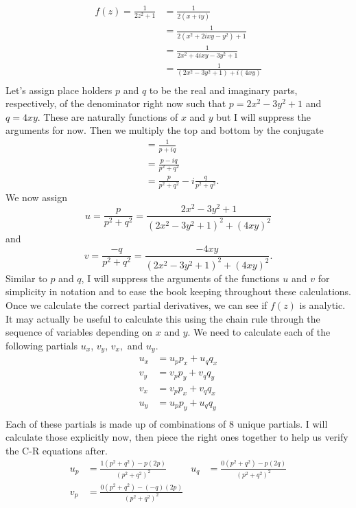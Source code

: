 \documentclass[10pt]{amsart}
\theoremstyle{nonumberplain}
\begin{document}
\begin{enumerate}[label={\bf {\arabic*}:}]
\begin{align*}
f(z) = \frac 1 {2z^2 + 1} &= \frac 1 {2\left( x + iy\right)} \\
	&= \frac 1 {2\left( x^2 +2ixy -y^2 \right) + 1} \\
	&= \frac 1 {2x^2 +4ixy -3y^2 + 1} \\
	&= \frac 1 {\left(2x^2 -3y^2 + 1\right) + i\left(4xy\right) } \\
\end{align*}
Let's assign place holders $p$ and $q$ to be the real and imaginary parts, respectively, of the denominator right now such that $p = 2x^2 -3y^2 + 1$ and $q = 4xy$.
These are naturally functions of $x$ and $y$ but I will suppress the arguments for now.
Then we multiply the top and bottom by the conjugate
\begin{align*}
&= \frac 1 {p + iq } \\
	&= \frac {p - iq}  {p^2 + q^2 } \\
	&= \frac {p}  {p^2 + q^2 } - i \frac {q}  {p^2 + q^2 }.
\end{align*}
We now assign
$$
u = \frac {p}  {p^2 + q^2 } = \frac{2x^2 -3y^2 + 1} {\left(2x^2 -3y^2 + 1\right)^2 + \left( 4xy \right)^2}
$$
and
$$
v = \frac {-q}  {p^2 + q^2 } = \frac{-4xy} {\left(2x^2 -3y^2 + 1\right)^2 + \left( 4xy \right)^2}.
$$
Similar to $p$ and $q$, I will suppress the arguments of the functions $u$ and $v$ for simplicity in notation and to ease the book keeping throughout these calculations.
Once we calculate the correct partial derivatives, we can see if $f(z)$ is analytic.
It may actually be useful to calculate this using the chain rule through the sequence of variables depending on $x$ and $y$.
We need to calculate each of the following partials $u_x$, $v_y$, $v_x,$ and $u_y$.
\begin{align*}
u_x &= u_pp_x + u_qq_x \\
v_y &= v_pp_y + v_qq_y \\
v_x &= v_pp_x + v_qq_x \\
u_y &= u_pp_y + u_qq_y \\
\end{align*}
Each of these partials is made up of combinations of 8 unique partials. I will calculate those explicitly now, then piece the right ones together to help us verify the C-R equations after.
\begin{align*}
u_p &= \frac{1\left(p^2 + q^2\right) - p\left(2p\right)}{\left(p^2 + q^2\right)^2}
	\quad &u_q& = \frac{0\left(p^2 + q^2\right) - p\left(2q\right)}{\left(p^2 + q^2\right)^2} \\
v_p &= \frac{0\left(p^2 + q^2\right) - (-q)\left(2p\right)}{\left(p^2 + q^2\right)^2} 

\end{align*}
\end{enumerate}
\end{document}
